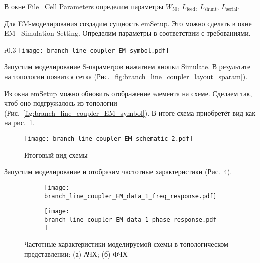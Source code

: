 В окне File \textrightarrow\ Cell Parameters определим параметры $W_{50}$, $L_\text{feed}$, $L_\text{shunt}$, $L_\text{serial}$.

Для EM-моделирования создадим сущность emSetup.
Это можно сделать в окне EM \textrightarrow\ Simulation Setting.
Определим параметры в соответствии с требованиями.

\begin{wrapfigure}{r}{0.3\textwidth}
    \centering
    \texttt{[image: branch\_line\_coupler\_EM\_symbol.pdf]}
    \caption{Обновлённый символ}%
    \label{fig:branch_line_coupler_EM_symbol}
\end{wrapfigure}

Запустим моделирование S-параметров нажатием кнопки Simulate.
В результате на топологии появится сетка (Рис.~\ref{fig:branch_line_coupler_layout_sparam}).

Из окна emSetup можно обновить отображение элемента на схеме.
Сделаем так, чтоб оно подгружалось из топологии (Рис.~\ref{fig:branch_line_coupler_EM_symbol}).
В итоге схема приобретёт вид как на рис.~\ref{fig:branch_line_coupler_EM_schematic_2}.
\begin{figure}
    \centering
    \texttt{[image: branch\_line\_coupler\_EM\_schematic\_2.pdf]}
    \caption{Итоговый вид схемы}%
    \label{fig:branch_line_coupler_EM_schematic_2}
\end{figure}

Запустим моделирование и отобразим частотные характеристики (Рис.~\ref{fig:branch_line_coupler_EM_data_1}).

\begin{figure}[!ht]
    \centering
    \begin{subfigure}[b]{0.45\textwidth}
        \centering
        \texttt{[image: branch\_line\_coupler\_EM\_data\_1\_freq\_response.pdf]}
        \caption{}%
    \label{fig:branch_line_coupler_EM_data_1_freq_response}
    \end{subfigure}
    \hfill
    \begin{subfigure}[b]{0.45\textwidth}
        \centering
        \texttt{[image: branch\_line\_coupler\_EM\_data\_1\_phase\_response.pdf]}
        \caption{}%
    \label{fig:branch_line_coupler_EM_data_1_phase_response}
    \end{subfigure}
    \caption{%
        Частотные характеристики моделируемой схемы в топологическом представлении:
        (а) АЧХ;
        (б) ФЧХ
    }%
    \label{fig:branch_line_coupler_EM_data_1}
\end{figure}

